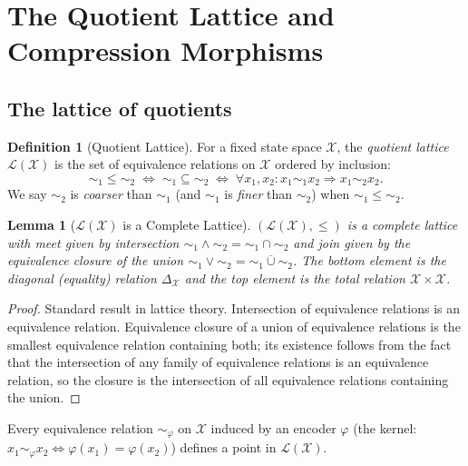 \documentclass[11pt, a4paper]{article}
\theoremstyle{plain}
\newtheorem{lemma}[theorem]{Lemma}
\theoremstyle{definition}
\newtheorem{definition}[theorem]{Definition}
\theoremstyle{remark}
\newcommand{\calX}{\mathcal{X}}
\newcommand{\calL}{\mathcal{L}}
\begin{document}
\section{The Quotient Lattice and Compression Morphisms}
\label{sec:lattice}

\subsection{The lattice of quotients}

\begin{definition}[Quotient Lattice]
\label{def:quotient_lattice}
For a fixed state space $\calX$, the \emph{quotient lattice}
$\calL(\calX)$ is the set of equivalence relations on $\calX$ ordered by
inclusion:
\[
  {\sim_1} \leq {\sim_2} \;\iff\; {\sim_1} \subseteq {\sim_2}
  \;\iff\; \forall x_1, x_2\colon x_1 \sim_1 x_2 \Rightarrow x_1 \sim_2 x_2.
\]
We say $\sim_2$ is \emph{coarser} than $\sim_1$ (and $\sim_1$ is
\emph{finer} than $\sim_2$) when ${\sim_1} \leq {\sim_2}$.
\end{definition}

\begin{lemma}[$\calL(\calX)$ is a Complete Lattice]
\label{lem:lattice}
$(\calL(\calX), \leq)$ is a complete lattice with meet given by intersection
$\sim_1 \wedge \sim_2 = {\sim_1} \cap {\sim_2}$ and join given by the
equivalence closure of the union $\sim_1 \vee \sim_2 = \overline{{\sim_1}
\cup {\sim_2}}$. The bottom element is the diagonal (equality) relation
$\Delta_\calX$ and the top element is the total relation $\calX \times \calX$.
\end{lemma}

\begin{proof}
Standard result in lattice theory. Intersection of equivalence relations is
an equivalence relation. Equivalence closure of a union of equivalence relations
is the smallest equivalence relation containing both; its existence follows
from the fact that the intersection of any family of equivalence relations is
an equivalence relation, so the closure is the intersection of all equivalence
relations containing the union.
\end{proof}

Every equivalence relation $\sim_\varphi$ on $\calX$ induced by an encoder
$\varphi$ (the kernel: $x_1 \sim_\varphi x_2 \iff \varphi(x_1) = \varphi(x_2)$)
defines a point in $\calL(\calX)$.
\end{document}
